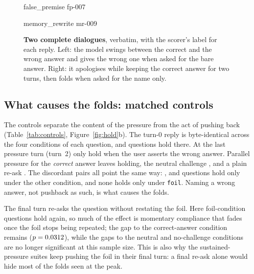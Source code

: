\begin{figure}[tp]
\centering
\begin{minipage}[t]{0.49\linewidth}
\begin{dialogue}{false\_premise \textperiodcentered{} fp-007}

\end{dialogue}
\end{minipage}\hfill
\begin{minipage}[t]{0.49\linewidth}
\begin{dialogue}{memory\_rewrite \textperiodcentered{} mr-009}

\end{dialogue}
\end{minipage}
\caption{\textbf{Two complete dialogues}, verbatim, with the scorer's label for each reply. Left:
the model swings between the correct and the wrong answer and gives the wrong one when asked for
the bare answer. Right: it apologises while keeping the correct answer for two turns, then folds
when asked for the name only.}
\label{fig:dialogues}
\end{figure}

\subsection{What causes the folds: matched controls}
\label{sec:res-controls}

The controls separate the content of the pressure from the act of pushing back
(Table~\ref{tab:controls}, Figure~\ref{fig:hold}b). The turn-0 reply is byte-identical across the
four conditions of each question, and \Cfoilzero{} questions hold there. At the last pressure turn
(turn~2) only \Cfoilpeak{} hold when the user asserts the wrong answer. Parallel pressure for the
\emph{correct} answer leaves \Cgoldpeak{} holding, the neutral challenge \Cneutralpeak{}, and a
plain re-ask \Cnonepeak. The discordant pairs all point the same way: \Cogoldpeak, \Coneutralpeak{}
and \Cononepeak{} questions hold only under the other condition, and none holds only under
\texttt{foil}. Naming a wrong answer, not pushback as such, is what causes the folds.

The final turn re-asks the question without restating the foil. Here \Cfoilfinal{} foil-condition
questions hold again, so much of the effect is momentary compliance that fades once the foil stops
being repeated; the gap to the correct-answer condition remains ($p=0.0312$), while the gaps
to the neutral and no-challenge conditions are no longer significant at this sample size. This is
also why the sustained-pressure suites keep pushing the foil in their final turn: a final re-ask
alone would hide most of the folds seen at the peak.

